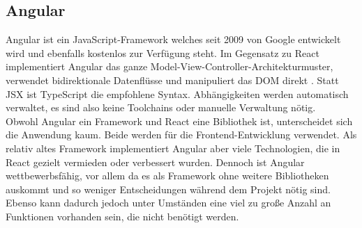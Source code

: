 \subsection{Angular}
Angular ist ein JavaScript-Framework welches seit 2009 von Google entwickelt wird und ebenfalls kostenlos zur Verfügung steht. Im Gegensatz zu React implementiert Angular das ganze Model-View-Controller-Architekturmuster, verwendet bidirektionale Datenflüsse und manipuliert das DOM direkt \cite{5}. Statt JSX ist TypeScript die empfohlene Syntax. Abhängigkeiten werden automatisch verwaltet, es sind also keine Toolchains oder manuelle Verwaltung nötig.\\
Obwohl Angular ein Framework und React eine Bibliothek ist, unterscheidet sich die Anwendung kaum. Beide werden für die Frontend-Entwicklung verwendet. Als relativ altes Framework implementiert Angular aber viele Technologien, die in React gezielt vermieden oder verbessert wurden. Dennoch ist Angular wettbewerbsfähig, vor allem da es als Framework ohne weitere Bibliotheken auskommt und so weniger Entscheidungen während dem Projekt nötig sind. Ebenso kann dadurch jedoch unter Umständen eine viel zu große Anzahl an Funktionen vorhanden sein, die nicht benötigt werden.
